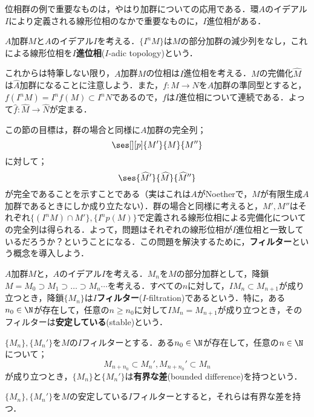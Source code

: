 位相群の例で重要なものは，やはり加群についての応用である．環$A$のイデアル$I$により定義される線形位相のなかで重要なものに，$I$進位相がある．

\begin{defi}[$I$進位相]
	$A$加群$M$と$A$のイデアル$I$を考える．$\{I^nM\}$は$M$の部分加群の減少列をなし，これによる線形位相を$I$\textbf{進位相}($I$-adic topology)という．
\end{defi}

これからは特筆しない限り，$A$加群$M$の位相は$I$進位相を考える．$M$の完備化$\widehat{M}$は$\widehat{A}$加群になることに注意しよう．また，$f:M\to N$を$A$加群の準同型とすると，$f(I^nM)=I^nf(M)\subset I^nN$であるので，$f$は$I$進位相について連続である．よって$\widehat{f}:\widehat{M}\to\widehat{N}$が定まる．

この節の目標は，群の場合と同様に$A$加群の完全列；
\[\ses[][p]{M'}{M}{M''}\]
に対して；
\[\ses{\widehat{M}'}{\widehat{M}}{\widehat{M}''}\]
が完全であることを示すことである（実はこれは$A$がNoetherで，$M$が有限生成$A$加群であるときにしか成り立たない）．群の場合と同様に考えると，$M',M''$はそれぞれ$\{(I^nM)\cap M'\},\{I^n p(M)\}$で定義される線形位相による完備化についての完全列は得られる．よって，問題はそれぞれの線形位相が$I$進位相と一致しているだろうか？ということになる．この問題を解決するために，\textbf{フィルター}という概念を導入しよう．

\begin{defi}[$I$フィルター]
	$A$加群$M$と，$A$のイデアル$I$を考える．$M_n$を$M$の部分加群として，降鎖$M=M_0\supset M_1\supset\dots\supset M_n\cdots$を考える．すべての$n$に対して，$IM_n\subset M_{n+1}$が成り立つとき，降鎖$\{M_n\}$は$I$\textbf{フィルター}($I$-filtration)であるという．特に，ある$n_0\in\N$が存在して，任意の$n\geq n_0$に対して$IM_n=M_{n+1}$が成り立つとき，そのフィルターは\textbf{安定している}(stable)という．
\end{defi}

\begin{defi}[有界な差]
	$\{M_n\},\{M_n'\}$を$M$の$I$フィルターとする．ある$n_0\in\N$が存在して，任意の$n\in\N$について；
	\[M_{n+n_0}\subset M_n',M_{n+n_0}'\subset M_n\]
	が成り立つとき，$\{M_n\}$と$\{M_n'\}$は\textbf{有界な差}(bounded difference)を持つという．
\end{defi}

\begin{lem}\label{lem:安定しているフィルターは有界な差を持つ}
	$\{M_n\},\{M_n'\}$を$M$の安定している$I$フィルターとすると，それらは有界な差を持つ．
\end{lem}

